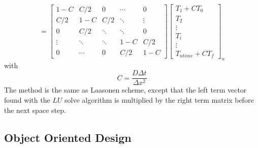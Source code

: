 \documentclass{article}
\begin{document}
                    \[
                        =
                        \begin{bmatrix}
                            1-C    &C/2    & 0      & \cdots & 0 \\
                            C/2     & 1-C   & C/2     & \ddots & \vdots \\
                            0      & C/2     & \ddots & \ddots & 0 \\
                            \vdots & \ddots & \ddots & 1-C   & C/2\\
                            0      & \cdots & 0      & C/2     & 1-C
                        \end{bmatrix}
                        \begin{bmatrix}
                            T_{1} + CT_{0}\\
                            T_{2} \\
                            \vdots \\
                            T_{i} \\
                            \vdots \\
                            T_{ntime} + CT_{f}
                        \end{bmatrix}_{n}
                    \]
                    with $$C = \frac{D\Delta t}{\Delta x ^2}  $$ 
                    The method is the same as Laasonen scheme, except that the left term vector found with the $LU$ solve
                    algorithm is multiplied by the right term matrix before the next space step.
            \subsection{Object Oriented Design}
\end{document}
